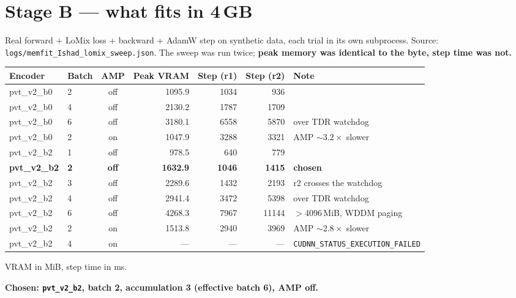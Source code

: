 \documentclass[11pt,a4paper]{article}
\newcommand{\code}[1]{\texttt{\small #1}}
\begin{document}
\section{Stage B --- what fits in 4\,GB}

Real forward + LoMix loss + backward + AdamW step on synthetic data, each trial
in its own subprocess. Source: \code{logs/memfit\_Ishad\_lomix\_sweep.json}. The
sweep was run twice; \textbf{peak memory was identical to the byte, step time
was not.}

\begin{center}
\begin{tabular}{@{}llcrrrl@{}}
\toprule
\textbf{Encoder} & \textbf{Batch} & \textbf{AMP} & \textbf{Peak VRAM} &
\textbf{Step (r1)} & \textbf{Step (r2)} & \textbf{Note} \\
\midrule
pvt\_v2\_b0 & 2 & off & 1095.9 & 1034 & 936 & \\
pvt\_v2\_b0 & 4 & off & 2130.2 & 1787 & 1709 & \\
pvt\_v2\_b0 & 6 & off & 3180.1 & 6558 & 5870 & over TDR watchdog \\
pvt\_v2\_b0 & 2 & on & 1047.9 & 3288 & 3321 & AMP $\sim3.2\times$ slower \\
pvt\_v2\_b2 & 1 & off & 978.5 & 640 & 779 & \\
\textbf{pvt\_v2\_b2} & \textbf{2} & \textbf{off} & \textbf{1632.9} &
  \textbf{1046} & \textbf{1415} & \textbf{chosen} \\
pvt\_v2\_b2 & 3 & off & 2289.6 & 1432 & 2193 & r2 crosses the watchdog \\
pvt\_v2\_b2 & 4 & off & 2941.4 & 3472 & 5398 & over TDR watchdog \\
pvt\_v2\_b2 & 6 & off & 4268.3 & 7967 & 11144 & $>$4096\,MiB, WDDM paging \\
pvt\_v2\_b2 & 2 & on & 1513.8 & 2940 & 3969 & AMP $\sim2.8\times$ slower \\
pvt\_v2\_b2 & 4 & on & --- & --- & --- & \code{CUDNN\_STATUS\_EXECUTION\_FAILED} \\
\bottomrule
\end{tabular}
\end{center}
{\small VRAM in MiB, step time in ms.}

\textbf{Chosen: \code{pvt\_v2\_b2}, batch 2, accumulation 3 (effective batch 6),
AMP off.}
\end{document}
